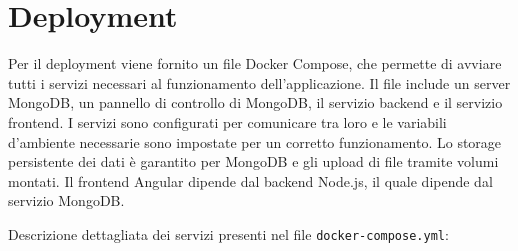 \chapter{Deployment}

Per il deployment viene fornito un file Docker Compose, che permette di avviare tutti i servizi necessari al funzionamento dell'applicazione. Il file include un server MongoDB, un pannello di controllo di MongoDB, il servizio backend e il servizio frontend. I servizi sono configurati per comunicare tra loro e le variabili d'ambiente necessarie sono impostate per un corretto funzionamento. Lo storage persistente dei dati è garantito per MongoDB e gli upload di file tramite volumi montati. Il frontend Angular dipende dal backend Node.js, il quale dipende dal servizio MongoDB.

Descrizione dettagliata dei servizi presenti nel file \texttt{docker-compose.yml}:

